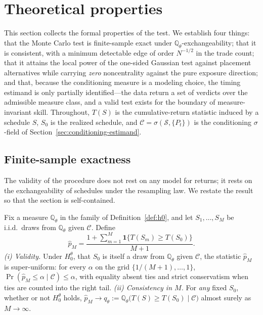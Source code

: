 
\section{Theoretical properties}
\label{sec:theory}

This section collects the formal properties of the test. We establish four
things: that the Monte Carlo test is finite-sample exact under
$\mathbb{Q}_\theta$-exchangeability; that it is consistent, with a minimum
detectable edge of order $N^{-1/2}$ in the trade count; that it attains the
local power of the one-sided Gaussian test against placement alternatives while
carrying \emph{zero} noncentrality against the pure exposure direction; and that,
because the conditioning measure is a modeling choice, the timing estimand is
only partially identified---the data return a set of verdicts over the
admissible measure class, and a valid test exists for the boundary of
measure-invariant skill. Throughout, $T(S)$ is the cumulative-return statistic
induced by a schedule $S$, $S_0$ is the realized schedule, and $\mathcal C=
\sigma(\mathcal S,\{P_t\})$ is the conditioning $\sigma$-field of
Section~\ref{sec:conditioning-estimand}.

\subsection{Finite-sample exactness}

The validity of the procedure does not rest on any model for returns; it rests
on the exchangeability of schedules under the resampling law. We restate the
result so that the section is self-contained.

\begin{proposition}
\label{prop:q-validity}
Fix a measure $\mathbb{Q}_\theta$ in the family of Definition~\ref{def:h0}, and
let $S_1,\dots,S_M$ be i.i.d.\ draws from $\mathbb{Q}_\theta$ given $\mathcal C$.
Define
\[
\hat p_M
=\frac{1+\sum_{m=1}^{M}\mathbf 1\{T(S_m)\ge T(S_0)\}}{M+1}.
\]
\emph{(i) Validity.} Under $H_0^\theta$, that $S_0$ is itself a draw from
$\mathbb{Q}_\theta$ given $\mathcal C$, the statistic $\hat p_M$ is super-uniform:
for every $\alpha$ on the grid $\{1/(M+1),\dots,1\}$,
$\Pr(\hat p_M\le\alpha\mid\mathcal C)\le\alpha$, with equality absent ties and
strict conservatism when ties are counted into the right tail.
\emph{(ii) Consistency in $M$.} For \emph{any} fixed $S_0$, whether or not
$H_0^\theta$ holds, $\hat p_M\to q_\theta:=\mathbb{Q}_\theta\big(T(S)\ge
T(S_0)\mid\mathcal C\big)$ almost surely as $M\to\infty$.
\end{proposition}

